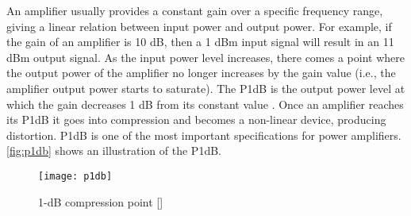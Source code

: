 An amplifier usually provides a constant gain over a specific frequency range, giving a linear relation between input power and output power. For example, if the gain of an amplifier is 10 dB, then a 1 dBm input signal will result in an 11 dBm output signal. As the input power level increases, there comes a point where the output power of the amplifier no longer increases by the gain value (i.e., the amplifier output power starts to saturate). The P1dB is the output power level at which the gain decreases 1 dB from its constant value \cite{p1db}. Once an amplifier reaches its P1dB it goes into compression and becomes a non-linear device, producing distortion. P1dB is one of the most important specifications for power amplifiers. \autoref{fig:p1db} shows an illustration of the P1dB.

\begin{figure}[ht]
  \centering
  \texttt{[image: p1db]}
  \caption{1-dB compression point [\citeauthor{p1db}]}
  \label{fig:p1db}
\end{figure}


